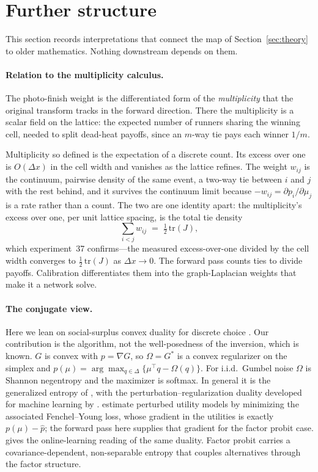 \documentclass[12pt]{article}
\theoremstyle{remark}
\begin{document}
\section{Further structure}\label{sec:structure}

This section records interpretations that connect the map of
Section~\ref{sec:theory} to older mathematics. Nothing downstream
depends on them.

\paragraph{Relation to the multiplicity calculus.} The photo-finish weight
is the differentiated form of the \emph{multiplicity} that the original
transform \citep{cotton2021} tracks in the forward direction. There the
multiplicity is a scalar field on the lattice: the expected number of
runners sharing the winning cell, needed to split dead-heat payoffs,
since an $m$-way tie pays each winner $1/m$.

Multiplicity so defined is the expectation of a discrete count. Its
excess over one is $O(\Delta x)$ in the cell width and vanishes as
the lattice refines. The weight $w_{ij}$ is the continuum, pairwise
density of the same event, a two-way tie between $i$ and $j$ with the
rest behind, and it survives the continuum limit because
$-w_{ij} = \partial p_i/\partial\mu_j$ is a rate rather than a count. The
two are one identity apart: the multiplicity's excess over one, per unit
lattice spacing, is the total tie density
\[
\sum_{i<j} w_{ij} \;=\; \tfrac12\,\mathrm{tr}(J),
\]
which experiment~37 confirms---the measured excess-over-one divided by
the cell width converges to $\tfrac12\,\mathrm{tr}(J)$ as
$\Delta x \to 0$. The forward pass counts ties to divide payoffs.
Calibration differentiates them into the graph-Laplacian weights that
make it a network solve.

\paragraph{The conjugate view.} Here we lean on social-surplus convex
duality for discrete choice \citep{chiong2016,norets2013}. Our
contribution is the algorithm, not the well-posedness of the inversion,
which is known. $G$ is
convex with $p = \nabla G$, so $\Omega = G^*$ is a convex regularizer on
the simplex and $p(\mu) = \arg\max_{q \in \Delta}\{\mu^\top q -
\Omega(q)\}$. For i.i.d.\ Gumbel noise $\Omega$ is Shannon negentropy and
the maximizer is softmax. In general it is the generalized entropy of
\citet{fosgerau2020}, with the perturbation--regularization duality
developed for machine learning by \citet{berthet2020}.
\citet{lin2026} estimate perturbed utility models by minimizing the
associated Fenchel--Young loss, whose gradient in the utilities is
exactly $p(\mu) - \hat p$; the forward pass here supplies that
gradient for the factor probit case.
\citet{melo2025} gives the online-learning reading of the same
duality. Factor probit
carries a covariance-dependent, non-separable entropy that couples
alternatives through the factor structure. 
\end{document}
